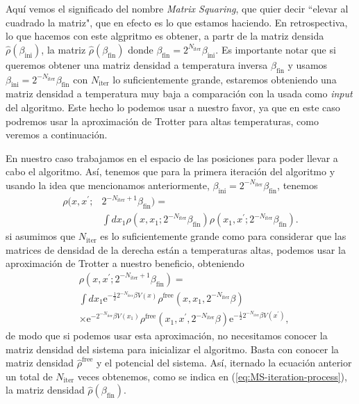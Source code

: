 \documentclass[%
 reprint,
 amsmath,amssymb,
 aps,
 pra,
]{revtex4-2}
\begin{document}
Aquí vemos el significado del nombre \textit{Matrix Squaring}, que quier decir ``elevar al cuadrado la matriz", que en efecto es lo que estamos haciendo. En retrospectiva, lo que hacemos con este algpritmo es obtener, a partr de la matriz densida $\hat{\rho}(\beta_{\mathrm{ini}})$, la matriz $\hat{\rho}(\beta_{\mathrm{fin}})$ donde $\beta_{\mathrm{fin}}=2^{N_{\mathrm{iter}}}\beta_{\mathrm{ini}}$. Es importante notar que si queremos obtener una matriz densidad a temperatura inversa $\beta_{\mathrm{fin}}$ y usamos $\beta_{\mathrm{ini}} =  2^{-N_{\mathrm{iter}}}\beta_{\mathrm{fin}}$  con $N_{\mathrm{iter}}$ lo suficientemente grande, estaremos obteniendo una matriz densidad a temperatura muy baja a comparación con la usada como \textit{input} del algoritmo. Este hecho lo podemos usar a nuestro favor, ya que en este caso podremos usar la aproximación de Trotter para altas temperaturas, como veremos a continuación.

En nuestro caso trabajamos en el espacio de las posiciones para poder llevar a cabo el algoritmo. Así, tenemos que para la primera iteración del algoritmo y usando la idea que mencionamos anteriormente, $\beta_{\mathrm{ini}} =  2^{-N_{\mathrm{iter}}}\beta_{\mathrm{fin}}$, tenemos
\begin{align}
	\rho (x,x^{\prime};&2^{-N_{\mathrm{iter}}+1}\beta_{\mathrm{fin}}) = \nonumber \\
	&\int dx_1 \rho (x,x_1;2^{-N_{\mathrm{iter}}}\beta_{\mathrm{fin}})\rho (x_1,x^{\prime};2^{-N_{\mathrm{iter}}}\beta_{\mathrm{fin}}). \label{eq:MS-first-iter}
\end{align}
si asumimos que $N_{\mathrm{iter}}$ es lo suficientemente grande como para considerar que las matrices de densidad de la derecha están a temperaturas altas, podemos usar la aproximación de Trotter a nuestro beneficio, obteniendo
\begin{align}
	&\rho (x,x^{\prime};2^{-N_{\mathrm{iter}}+1}\beta_{\mathrm{fin}}) = \nonumber \\
	&\int dx_1 \mathrm{e}^{-\frac{1}{2} 2^{-N_{\mathrm{iter}}} \beta V(x)} \rho^{\mathrm{free}}\left(x, x_1, 2^{-N_{\mathrm{iter}}}\beta\right)  \nonumber \\
	& \times  \mathrm{e}^{- 2^{-N_{\mathrm{iter}}}\beta V\left(x_1\right)}  \rho^{\mathrm{free}}\left(x_1, x^{\prime}, 2^{-N_{\mathrm{iter}}} \beta\right) \mathrm{e}^{-\frac{1}{2} 2^{-N_{\mathrm{iter}}} \beta V\left(x^{\prime}\right)},
\end{align}
de modo que si podemos usar esta aproximación, no necesitamos conocer la matriz densidad del sistema para inicializar el algoritmo. Basta con conocer la matriz densidad $\hat{\rho}^{\mathrm{free}}$ y el potencial del sistema. Así, iternado la ecuación anterior un total de $N_{\mathrm{iter}}$ veces obtenemos, como se indica en (\ref{eq:MS-iteration-process}), la matriz densidad $\hat{\rho}(\beta_\mathrm{fin})$.
\end{document}
